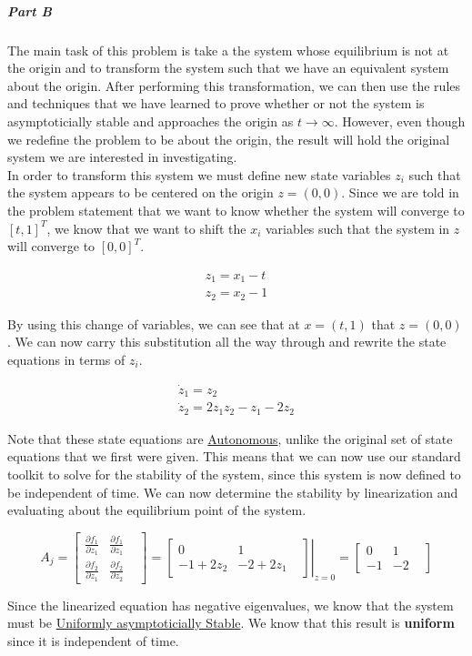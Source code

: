 \subparagraph*{Part B}

The main task of this problem is take a the system whose equilibrium is not at the origin and to transform the system such that we have an equivalent system about the origin. After performing this transformation, we can then use the rules and techniques that we have learned to prove whether or not the system is asymptoticially stable and approaches the origin as $t\rightarrow \infty$.  However, even though we redefine the problem to be about the origin, the result will hold the original system we are interested in investigating. \\

\noindent In order to transform this system we must define new state variables $z_i$ such that the system appears to be centered on the origin $z = (0,0)$. Since we are told in the problem statement that we want to know whether the system will converge to $[t, 1]^T$, we know that we want to shift the $x_i$ variables such that the system in $z$ will converge to $[0, 0]^T$.

$$
\begin{array}{l}
  z_{1}= x_1 - t \\
  z_{2}= x_2 - 1
\end{array}
$$

\noindent By using this change of variables, we can see that at $x = (t, 1) $ that $z = (0,0)$. We can now carry this substitution all the way through and rewrite the state equations in terms of $z_i$.

$$
\begin{array}{l}
  \dot{z}_{1}= z_2 \\
  \dot{z}_{2}= 2z_1z_2 - z_1 - 2z_2
\end{array}
$$

\noindent Note that these state equations are \underline{Autonomous}, unlike the original set of state equations that we first were given. This means that we can now use our standard toolkit to solve for the stability of the system, since this system is now defined to be independent of time. We can now determine the stability by linearization and evaluating about the equilibrium point of the system.



$$
A_j =
\begin{bmatrix}
  \frac{\partial f_{1}}{\partial z_{1}} & \frac{\partial f_{1}}{\partial z_{1}} & \\

  \frac{\partial f_{2}}{\partial z_{1}} & \frac{\partial f_{2}}{\partial z_{2}}&
\end{bmatrix}
=
\left .
\begin{bmatrix}
 0 & 1 & \\
-1+2 z_2 & -2 +2 z_1
\end{bmatrix} \right\rvert_{z=0} =
\begin{bmatrix}
  0 & 1 & \\
  -1 & -2 &
\end{bmatrix}
$$

\noindent Since the linearized equation has negative eigenvalues, we know that the system must be \underline{Uniformly asymptoticially Stable}. We know that this result is \textbf{uniform} since it is independent of time.
